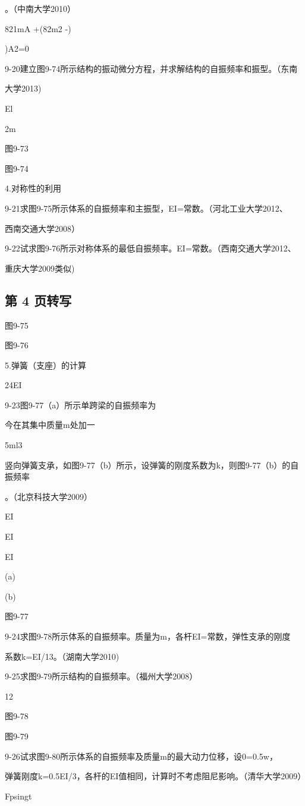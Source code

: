 。（中南大学2010）

821mA +(82m2 -)

)A2=0

9-20建立图9-74所示结构的振动微分方程，并求解结构的自振频率和振型。（东南

大学2013)

El

2m

图9-73

图9-74

4.对称性的利用

9-21求图9-75所示体系的自振频率和主振型，EI=常数。（河北工业大学2012、

西南交通大学2008）

9-22试求图9-76所示对称体系的最低自振频率。EI=常数。（西南交通大学2012、

重庆大学2009类似)

\subsection*{第 4 页转写}
图9-75

图9-76

5.弹簧（支座）的计算

24EI

9-23图9-77（a）所示单跨梁的自振频率为

今在其集中质量m处加一

5ml3

竖向弹簧支承，如图9-77（b）所示，设弹簧的刚度系数为k，则图9-77（b）的自振频率

。（北京科技大学2009）

EI

EI

EI

(a)

(b)

图9-77

9-24求图9-78所示体系的自振频率。质量为m，各杆EI=常数，弹性支承的刚度

系数k=EI/13。（湖南大学2010)

9-25求图9-79所示结构的自振频率。（福州大学2008）

12

图9-78

图9-79

9-26试求图9-80所示体系的自振频率及质量m的最大动力位移，设0=0.5w，

弹簧刚度k=0.5EI/3，各杆的EI值相同，计算时不考虑阻尼影响。（清华大学2009）

Fpsingt

